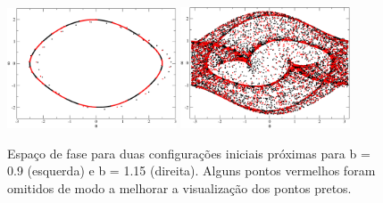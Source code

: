\documentclass[a4wide]{report}
\begin{document}
\begin{figure}[!htb]
\centering
\includegraphics[width=0.447\textwidth]{1ab.pdf}
\includegraphics[width=0.447\textwidth]{2ab.pdf}
\caption{ Espaço de fase para duas configurações iniciais próximas para b = 0.9 (esquerda) e b = 1.15 (direita). Alguns pontos vermelhos foram omitidos de modo a melhorar a visualização dos pontos pretos.  }
\label{a12}
\end{figure}
\end{document}
